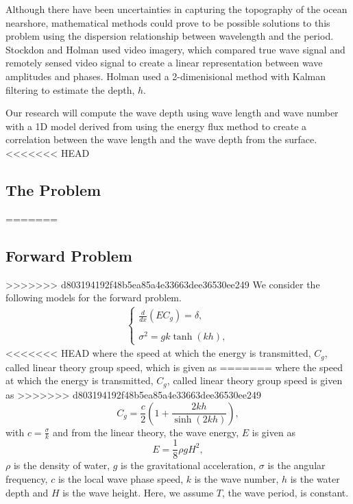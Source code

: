 Although there have been uncertainties in capturing the topography of the ocean nearshore, mathematical methods could prove to be possible solutions to this problem using the dispersion relationship between wavelength and the period. Stockdon and Holman used video imagery, which compared true wave signal and remotely sensed video signal to create a linear representation between wave amplitudes and phases. Holman used a 2-dimenisional method with Kalman filtering to estimate the depth, $h$.

Our research will compute the wave depth using wave length and wave number with a 1D model derived from using the energy flux method to create a correlation between the wave length and the wave depth from the surface.
<<<<<<< HEAD
\subsection{The Problem}
=======
\subsection{Forward Problem}
>>>>>>> d803194192f48b5ea85a4e33663dee36530ee249
We consider the following models for the forward problem.
\begin{eqnarray}
\label{fp1}
\left \{
\begin{array}{lll}
\frac{d}{dx}\left(EC_g\right)=\delta,\\
\\
\sigma^2=gk\tanh(kh),
\label{ode}
\end{array}
\right.
\end{eqnarray}
<<<<<<< HEAD
where the speed at which the energy is transmitted, $C_g$, called linear theory group speed, which is given as
=======
where the speed at which the energy is transmitted, $C_g$, called linear theory group speed is given as
>>>>>>> d803194192f48b5ea85a4e33663dee36530ee249
\begin{equation}
\label{cg}
C_g=\frac{c}{2}\left(1+\frac{2kh}{\sinh(2kh)}\right),
\end{equation}
with $c=\frac{\sigma}{k}$ and from the linear theory, the wave energy, $E$ is given as
\begin{equation}
\label{e}
E=\frac{1}{8}\rho g H^2,
\end{equation}
$\rho$ is the density of water, $g$ is the gravitational acceleration, $\sigma$ is the angular frequency, $c$ is the local wave phase speed, $k$ is the wave number, $h$ is the water depth and $H$ is the wave height. Here, we assume $T$, the wave period, is constant.\\ 


